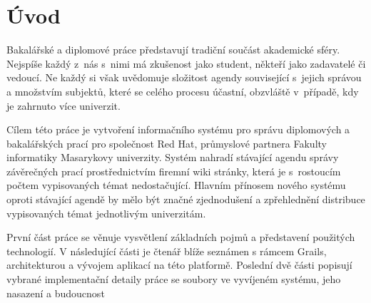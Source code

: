 \chapter{Úvod}
Bakalářské a diplomové práce představují tradiční součást akademické sféry. Nejspíše každý z~nás s~nimi má zkušenost jako student, někteří jako zadavatelé či vedoucí. Ne každý si však uvědomuje složitost agendy související s~jejich správou a množstvím subjektů, které se celého procesu účastní, obzvláště v~případě, kdy je zahrnuto více univerzit.


Cílem této práce je vytvoření informačního systému pro správu diplomových a bakalářských prací pro společnost Red Hat, průmyslové partnera Fakulty informatiky Masarykovy univerzity. Systém nahradí stávající agendu správy závěrečných prací prostřednictvím firemní wiki stránky, která je s~rostoucím počtem vypisovaných témat nedostačující. Hlavním přínosem nového systému oproti stávající agendě by mělo být značné zjednodušení a zpřehlednění distribuce vypisovaných témat jednotlivým univerzitám.


První část práce se věnuje vysvětlení základních pojmů a představení použitých technologií. V následující části je čtenář blíže seznámen s rámcem Grails, architekturou a vývojem aplikací na této platformě. Poslední dvě části popisují vybrané implementační detaily práce se soubory ve vyvíjeném systému, jeho nasazení a budoucnost
